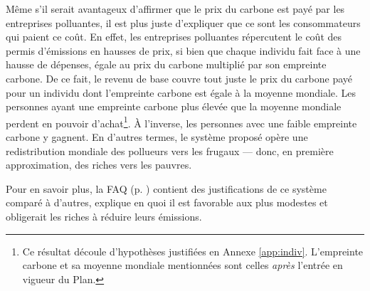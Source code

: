 \documentclass[a5paper,french,openany]{memoir}
\begin{document}
Même s'il serait avantageux %
d'affirmer que le prix du carbone est payé par les entreprises polluantes, il est plus juste d'expliquer que ce sont les consommateurs qui paient ce coût. 
En effet, les entreprises polluantes répercutent le coût des permis d'émissions en hausses de prix, si bien que chaque individu fait face à une hausse de dépenses, égale au prix du carbone multiplié par son empreinte carbone. De ce fait, le revenu de base couvre tout juste le prix du carbone payé pour un individu dont l'empreinte carbone est égale à la moyenne mondiale. Les personnes ayant une empreinte carbone plus élevée que la moyenne mondiale perdent en pouvoir d'achat\footnote{Ce résultat découle d'hypothèses justifiées en Annexe \ref{app:indiv}. L'empreinte carbone et sa moyenne mondiale mentionnées sont celles \textit{après} l'entrée en vigueur du Plan.
}. À l'inverse, les personnes avec une faible empreinte carbone y gagnent. En d'autres termes, le système proposé opère une redistribution mondiale des pollueurs vers les frugaux --- donc, en première approximation, des riches vers les pauvres. 

Pour en savoir plus, la FAQ (p. \pageref{q:riches}) contient des justifications de ce système comparé à d'autres, explique en quoi il est favorable aux plus modestes et obligerait les riches à réduire leurs émissions.
\end{document}
